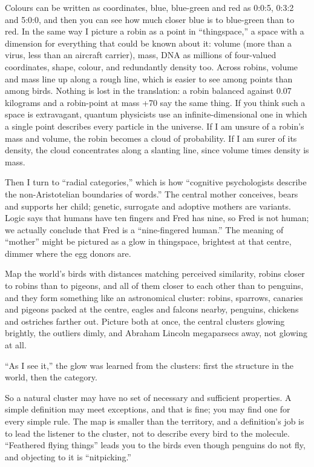 
Colours can be written as coordinates, blue, blue-green and red as 0:0:5, 0:3:2 and 5:0:0, and then you can see how much closer blue is to blue-green than to red. In the same way I picture a robin as a point in ``thingspace,'' a space with a dimension for everything that could be known about it: volume (more than a virus, less than an aircraft carrier), mass, DNA as millions of four-valued coordinates, shape, colour, and redundantly density too. Across robins, volume and mass line up along a rough line, which is easier to see among points than among birds. Nothing is lost in the translation: a robin balanced against 0.07 kilograms and a robin-point at mass +70 say the same thing. If you think such a space is extravagant, quantum physicists use an infinite-dimensional one in which a single point describes every particle in the universe. If I am unsure of a robin's mass and volume, the robin becomes a cloud of probability. If I am surer of its density, the cloud concentrates along a slanting line, since volume times density is mass.

Then I turn to ``radial categories,'' which is how ``cognitive psychologists describe the non-Aristotelian boundaries of words.'' The central mother conceives, bears and supports her child; genetic, surrogate and adoptive mothers are variants. Logic says that humans have ten fingers and Fred has nine, so Fred is not human; we actually conclude that Fred is a ``nine-fingered human.''  The meaning of ``mother'' might be pictured as a glow in thingspace, brightest at that centre, dimmer where the egg donors are.

Map the world's birds with distances matching perceived similarity, robins closer to robins than to pigeons, and all of them closer to each other than to penguins, and they form something like an astronomical cluster: robins, sparrows, canaries and pigeons packed at the centre, eagles and falcons nearby, penguins, chickens and ostriches farther out. Picture both at once, the central clusters glowing brightly, the outliers dimly, and Abraham Lincoln megaparsecs away, not glowing at all.

``As I see it,'' the glow was learned from the clusters: first the structure in the world, then the category. 

So a natural cluster may have no set of necessary and sufficient properties.  A simple definition may meet exceptions, and that is fine; you may find one for every simple rule. The map is smaller than the territory, and a definition's job is to lead the listener to the cluster, not to describe every bird to the molecule. ``Feathered flying things'' leads you to the birds even though penguins do not fly, and objecting to it is ``nitpicking.''
